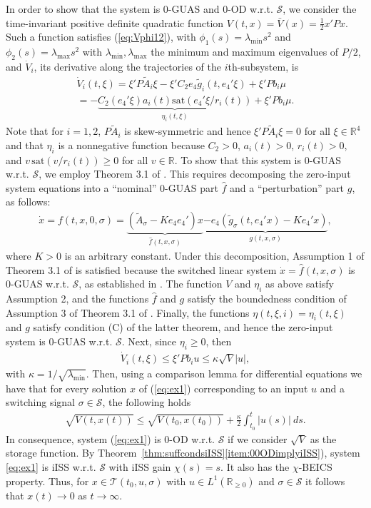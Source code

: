 \documentclass[9pt,final,journal]{IEEEtran}
\def\R{\mathbb{R}}
\def\S{\mathcal{S}}
\def\T{\mathcal{T}}
\def\sat{\mathrm{sat}}
\begin{document}
  In order to show that the system is 0-GUAS and 0-OD w.r.t. $\S$, 
  we consider the time-invariant positive definite quadratic function 
  $V(t,x) = \bar V(x) = \frac{1}{2}x'Px$. Such a function satisfies (\ref{eq:Vphi12}), with $\phi_1(s) = \lambda_{\min}s^2$ and $\phi_2(s)=\lambda_{\max}s^2$ with $\lambda_{\min},\lambda_{\max}$ the minimum and maximum eigenvalues of $P/2$, and $\dot V_i$, its derivative along the trajectories of the $i$th-subsystem, is
  \begin{multline*}
    \dot{V}_i(t,\xi)=
    \xi'P\tilde A_i \xi - \xi' C_2 e_4 \tilde g_i(t,e_4'\xi)+\xi'Pb_i\mu\\
    = -\underbrace{C_2 (e_4'\xi) a_i(t)\sat(e_4'\xi/r_i(t))}_{\eta_i(t,\xi)}+\xi'Pb_i\mu.
  \end{multline*}
  Note that for $i=1,2$, $P\tilde A_i$ is skew-symmetric and hence $\xi'P\tilde A_i \xi = 0$ for all $\xi\in\R^4$ and that $\eta_i$ is a nonnegative function because $C_2 > 0$, $a_i(t) > 0$, $r_i(t) > 0$, and $v\,\sat(v/r_i(t)) \ge 0$ for all $v\in\R$. 
%  
  To show that this system is 0-GUAS w.r.t. $\S$, we employ Theorem 3.1 of \cite{manhai_tac17}. This requires decomposing the zero-input system equations into a ``nominal'' 0-GUAS part $\hat f$ and a ``perturbation'' part $g$, as follows:
  \begin{align*}
   \dot x = f(t,x,0,\sigma) = \underbrace{(\tilde A_{\sigma} - K e_4 e_4')x}_{\hat f(t,x,\sigma)} \underbrace{- e_4 (\tilde g_{\sigma}(t,e_4'x) - K e_4'x)}_{g(t,x,\sigma)},
  \end{align*}
  where $K>0$ is an arbitrary constant. Under this decomposition, Assumption 1 of Theorem 3.1 of \cite{manhai_tac17} is satisfied because the switched linear system $\dot x = \hat f(t,x,\sigma)$ is 0-GUAS w.r.t. $\S$, as established in \cite{haimid_cdc13}. The function $V$ and $\eta_i$ as above satisfy Assumption 2, and the functions $\hat f$ and $g$ satisfy the boundedness condition of Assumption 3 of Theorem 3.1 of \cite{manhai_tac17}. Finally, the functions $\eta(t,\xi,i) = \eta_i(t,\xi)$ and $g$ satisfy condition (C) of the latter theorem, and hence the zero-input system is 0-GUAS w.r.t. $\S$. 
%
Next, since $\eta_i \ge 0$, then 
  \begin{align*}
     \dot{V}_i(t,\xi)\le \xi'Pb_i u\le \kappa \sqrt{V} |u|,
  \end{align*}
with $\kappa = 1/\sqrt{\lambda_{\min}}$. Then, using a comparison lemma for differential equations we have that for every solution $x$ of (\ref{eq:ex1})
corresponding to an input $u$ and a switching signal $\sigma\in \S$, the following holds
\begin{align*}
 \sqrt{V(t,x(t))}\le \sqrt{V(t_0,x(t_0))}+\frac{\kappa}{2} \int_{t_0}^t|u(s)|\:ds.
\end{align*}
In consequence, system (\ref{eq:ex1}) is 0-OD w.r.t. $\S$ if we consider $\sqrt{V}$ as the storage function. By Theorem~\ref{thm:suffcondsiISS}\ref{item:00ODimplyiISS}), system \eqref{eq:ex1} is iISS w.r.t. $\S$ with iISS gain $\chi(s)=s$. It also has the $\chi$-BEICS property. Thus, for $x\in \T(t_0,u,\sigma)$ with $u \in L^1(\R_{\ge 0})$ and $\sigma\in \S$ it follows that $x(t)\to 0$ as $t\to \infty$.
\end{document}
